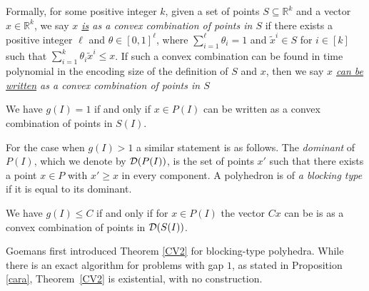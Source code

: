 
Formally, for some positive integer $k$, given a set of points $S\subseteq \mathbb{R}^k$ and a vector $x\in \mathbb{R}^k$, we say \textit{$x$ \underline{is} as a convex combination of points in $S$} if there exists a positive integer $\ell$ and $\theta \in [0,1]^\ell$, where $\sum_{i=1}^{\ell}\theta_i =1$ and $\tilde{x}^i\in S$ for $i\in [k]$ such that $\sum_{i=1}^{k}\theta_i \tilde{x}^i\leq x$. If such a convex combination can be found in time polynomial in the encoding size of the definition of $S$ and $x$, then we say  \textit{$x$ \underline{can be written} as a convex combination of points in $S$}

\begin{proposition}\label{cara}
	We have $g(I)=1$ if and only if $x\in P(I)$ can be written as a convex combination of points in $S(I)$.
\end{proposition}

For the case when $g(I)>1$ a similar statement is as follows. The {\em dominant} of $P(I)$, which we denote by $\operatorname{\mathcal{D}}(P(I))$, is the set of points $x'$ such that there exists a point $x\in P$ with $x'\geq x$ in every component. A polyhedron is of \textit{a blocking type} if it is equal to its dominant.

\begin{thm} \label{CV2}
	We have $g(I) \leq C$ if and only if for $x\in P(I)$ the vector $Cx$ can be is as a convex combination of points in $\operatorname{\mathcal{D}}(S(I))$. 
\end{thm}
Goemans \cite{goemansblocking} first introduced Theorem \ref{CV2} for blocking-type polyhedra. While there is an exact algorithm for problems with gap $1$, as stated in Proposition \ref{cara}, Theorem~\ref{CV2} is existential, with no construction.
\iffalse


